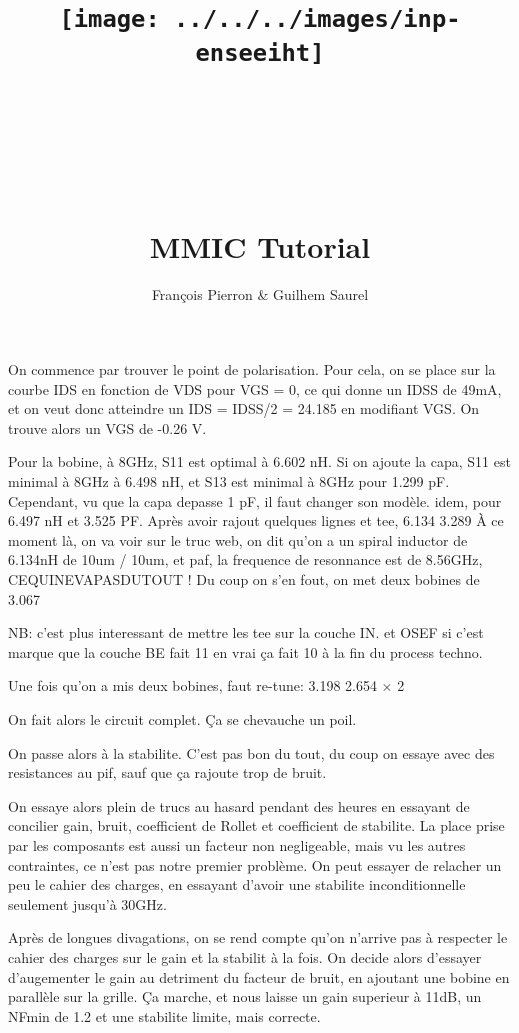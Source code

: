 \documentclass{article}
\title{\texttt{[image: ../../../images/inp-enseeiht]} \\ ~ \\ ~ \\ ~ \\ ~ \\ MMIC Tutorial}
\author{François Pierron \& Guilhem Saurel}
\date{\oldstylenums{\today}}
\begin{document}
\begin{titlepage}
    \setcounter{page}{0}
    \maketitle
    \thispagestyle{empty}
\end{titlepage}

\tableofcontents

On commence par trouver le point de polarisation. Pour cela, on se place sur la courbe IDS en fonction de VDS pour VGS = 0, ce qui donne un IDSS de 49mA, et on veut donc atteindre un IDS = IDSS/2 = 24.185 en modifiant VGS. On trouve alors un VGS de -0.26 V.

Pour la bobine, à 8GHz, S11 est optimal à 6.602 nH.
Si on ajoute la capa, S11 est minimal à 8GHz à 6.498 nH, et S13 est minimal à 8GHz pour 1.299 pF.
Cependant, vu que la capa depasse 1 pF, il faut changer son modèle.
idem, pour 6.497 nH et 3.525 PF.
Après avoir rajout quelques lignes et tee, 6.134 3.289
À ce moment là, on va voir sur le truc web, on dit qu’on a un spiral inductor de 6.134nH de 10um / 10um, et paf, la frequence de resonnance est de 8.56GHz, CEQUINEVAPASDUTOUT !
Du coup on s’en fout, on met deux bobines de 3.067

NB: c’est plus interessant de mettre les tee sur la couche IN. et OSEF si c’est marque que la couche BE fait 11 en vrai ça fait 10 à la fin du process techno.

Une fois qu’on a mis deux bobines, faut re-tune: 3.198 2.654 × 2

On fait alors le circuit complet. Ça se chevauche un poil.

On passe alors à la stabilite. C’est pas bon du tout, du coup on essaye avec des resistances au pif, sauf que ça rajoute trop de bruit.

On essaye alors plein de trucs au hasard pendant des heures en essayant de concilier gain, bruit, coefficient de Rollet et coefficient de stabilite. La place prise par les composants est aussi un facteur non negligeable, mais vu les autres contraintes, ce n’est pas notre premier problème. On peut essayer de relacher un peu le cahier des charges, en essayant  d’avoir une stabilite inconditionnelle seulement jusqu’à 30GHz.

Après de longues divagations, on se rend compte qu’on n’arrive pas à respecter le cahier des charges sur le gain et la stabilit à la fois. On decide alors d’essayer d’augementer le gain au detriment du facteur de bruit, en ajoutant une bobine en parallèle sur la grille. Ça marche, et nous laisse un gain superieur à 11dB, un NFmin de 1.2 et une stabilite limite, mais correcte.
\end{document}
